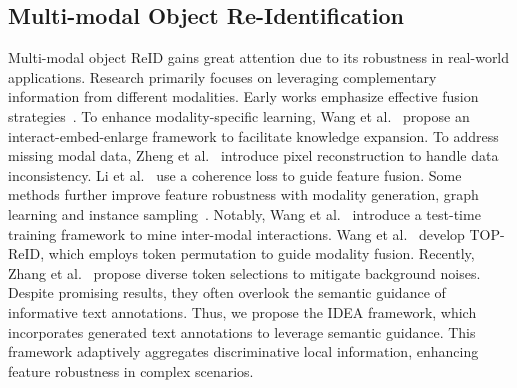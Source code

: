 \subsection{Multi-modal Object Re-Identification}
Multi-modal object ReID gains great attention due to its robustness in real-world applications. 
%
Research primarily focuses on leveraging complementary information from different modalities. 
%
Early works emphasize effective fusion strategies~\cite{gong2021eliminate,zheng2021robust}. 
%
To enhance modality-specific learning, Wang et al.~\cite{wang2022interact} propose an interact-embed-enlarge framework to facilitate knowledge expansion. 
%
To address missing modal data, Zheng et al.~\cite{zheng2023dynamic} introduce pixel reconstruction to handle data inconsistency. 
%
Li et al.~\cite{li2020multi} use a coherence loss to guide feature fusion. 
%
Some methods further improve feature robustness with modality generation, graph learning and instance sampling~\cite{he2023graph, guo2022generative, zheng2023cross}. 
%
%
%
Notably, Wang et al.~\cite{wang2024heterogeneous} introduce a test-time training framework to mine inter-modal interactions. 
%
Wang et al.~\cite{wang2024top} develop TOP-ReID, which employs token permutation to guide modality fusion.
%
Recently, Zhang et al.~\cite{zhang2024magic} propose diverse token selections to mitigate background noises.
%
Despite promising results, they often overlook the semantic guidance of informative text annotations.
%
Thus, we propose the IDEA framework, which incorporates generated text annotations to leverage semantic guidance.
%
This framework adaptively aggregates discriminative local information, enhancing feature robustness in complex scenarios.